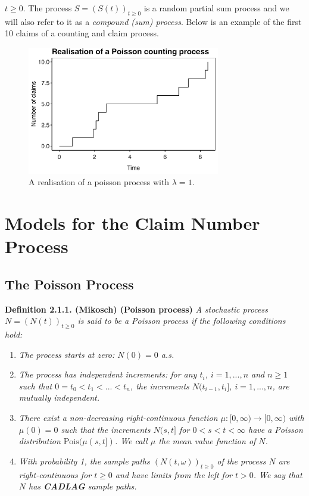 \documentclass[a4paper,12pt,openany]{book}
\providecommand{\tightlist}{%
 \setlength{\itemsep}{0pt}\setlength{\parskip}{0pt}}
\begin{document}
\(t\ge 0\). The process \(S=(S(t))_{t\ge 0}\) is a random partial sum process and we will also refer to it as a \emph{compound (sum) process}. Below is an example of the first 10 claims of a counting and claim process.

\begin{figure}[H]
  \begin{center}
    \includegraphics[width=0.75\textwidth]{figures/skade1_plot1.png}
  \end{center}
  \caption{A realisation of a poisson process with $\lambda = 1$.}
\end{figure}

\hypertarget{models-for-the-claim-number-process}{%
\section{Models for the Claim Number Process}\label{models-for-the-claim-number-process}}

\hypertarget{the-poisson-process}{%
\subsection{The Poisson Process}\label{the-poisson-process}}

\textbf{Definition 2.1.1. (Mikosch) (Poisson process)} \emph{A stochastic process \(N=(N(t))_{t\ge 0}\) is said to be a Poisson process if the following conditions hold:}

\begin{enumerate}
\def\labelenumi{(\arabic{enumi})}
\tightlist
\item
  \emph{The process starts at zero: \(N(0)=0\) a.s.}
\item
  \emph{The process has independent increments: for any \(t_i\), \(i=1,...,n\) and \(n\ge 1\) such that \(0=t_0<t_1<...<t_n\), the increments \(N(t_{i-1},t_i]\), \(i=1,...,n\), are mutually independent.}
\item
  \emph{There exist a non-decreasing right-continuous function \(\mu : [0,\infty)\to [0,\infty)\) with \(\mu(0)=0\) such that the increments \(N(s,t]\) for \(0<s<t<\infty\) have a Poisson distribution \(\text{Pois}(\mu(s,t])\). We call \(\mu\) the mean value function of \(N\).}
\item
  \emph{With probability 1, the sample paths \((N(t,\omega))_{t\ge 0}\) of the process \(N\) are right-continuous for \(t \ge 0\) and have limits from the left for \(t > 0\). We say that \(N\) has \textbf{CADLAG} sample paths.}
\end{enumerate}
\end{document}
